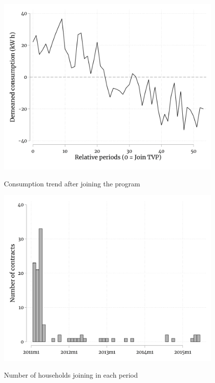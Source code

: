 
\begin{figure}[ht]
  \caption{Consumption trend after joining the program}\label{fig:eight}
  \begin{center}
  {\includegraphics[width=1\textwidth]{./figures/consumptionAfterEntry.png}}
  \end{center}
\end{figure}

\FloatBarrier

\begin{figure}[ht]
  \caption{Number of households joining in each period}\label{fig:nine}
  \begin{center}
  {\includegraphics[width=1\textwidth]{./figures/numberJoinersPerMonth.png}}
  \end{center}
\end{figure}


